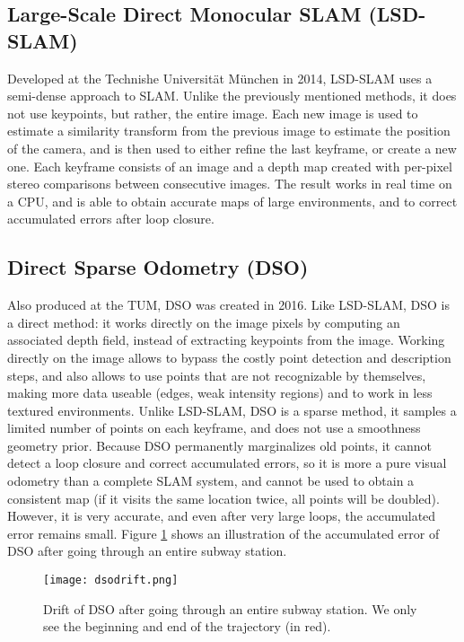 \subsection{Large-Scale Direct Monocular SLAM (LSD-SLAM)}
Developed at the Technishe Universität München in 2014, LSD-SLAM \cite{lsdslam} uses a semi-dense approach to SLAM. Unlike the previously mentioned methods, it does not use keypoints, but rather, the entire image. Each new image is used to estimate a similarity transform from the previous image to estimate the position of the camera, and is then used to either refine the last keyframe, or create a new one. Each keyframe consists of an image and a depth map created with per-pixel stereo comparisons between consecutive images. The result works in real time on a CPU, and is able to obtain accurate maps of large environments, and to correct accumulated errors after loop closure.

\subsection{Direct Sparse Odometry (DSO)}
Also produced at the TUM, DSO \cite{dso} was created in 2016. Like LSD-SLAM, DSO is a direct method: it works directly on the image pixels by computing an associated depth field, instead of extracting keypoints from the image. Working directly on the image allows to bypass the costly point detection and description steps, and also allows to use points that are not recognizable by themselves, making more data useable (edges, weak intensity regions) and to work in less textured environments. Unlike LSD-SLAM, DSO is a sparse method, it samples a limited number of points on each keyframe, and does not use a smoothness geometry prior. Because DSO permanently marginalizes old points, it cannot detect a loop closure and correct accumulated errors, so it is more a pure visual odometry than a complete SLAM system, and cannot be used to obtain a consistent map (if it visits the same location twice, all points will be doubled). However, it is very accurate, and even after very large loops, the accumulated error remains small. Figure \ref{fig:dsodrift} shows an illustration of the accumulated error of DSO after going through an entire subway station.

\begin{figure}[H]
  \centering
  \texttt{[image: dsodrift.png]}
    \caption{Drift of DSO after going through an entire subway station. We only see the beginning and end of the trajectory (in red). \cite{dsovid}}
    \label{fig:dsodrift}
\end{figure}

